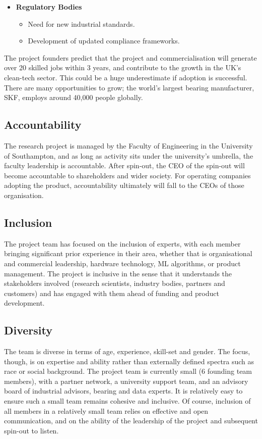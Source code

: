 \documentclass[runningheads]{llncs}
\begin{document}
\begin{itemize}
\begin{itemize}
        \item Loss of market for bearing manufacturers who rely solely on volume.
        \item Proposed bearings are more sophisticated, and greater added value.
        \item Manufacturers-under-license need to be forward-looking.
    \end{itemize}
    \item \textbf{Regulatory Bodies}
    \begin{itemize}
        \item Need for new industrial standards.
        \item Development of updated compliance frameworks.
    \end{itemize}
    \end{itemize}
    The project founders predict that the project and commercialisation will generate over 20 skilled jobs within 3 years, and contribute to the growth in the UK's clean-tech sector. This could be a huge underestimate if adoption is successful. There are many opportunities to grow; the world's largest bearing manufacturer, SKF, employs around 40,000 people globally.
\subsection{Accountability}
    The research project is managed by the Faculty of Engineering in the University of Southampton, and as long as activity sits under the university's umbrella, the faculty leadership is accountable. After spin-out, the CEO of the spin-out will become accountable to shareholders and wider society. For operating companies adopting the product, accountability ultimately will fall to the CEOs of those organisation.
\subsection{Inclusion}
    The project team has focused on the inclusion of experts, with each member bringing significant prior experience in their area, whether that is organisational and commercial leadership, hardware technology, ML algorithms, or product management. The project is inclusive in the sense that it understands the stakeholders involved (research scientists, industry bodies, partners and customers) and has engaged with them ahead of funding and product development.
\subsection{Diversity}
    The team is diverse in terms of age, experience, skill-set and gender. The focus, though, is on expertise and ability rather than externally defined spectra such as race or social background.
    The project team is currently small (6 founding team members), with a partner network, a university support team, and an advisory board of industrial advisors, bearing and data experts. It is relatively easy to ensure such a small team remains cohesive and inclusive. Of course, inclusion of all members in a relatively small team relies on effective and open communication, and on the ability of the leadership of the project and subsequent spin-out to listen.
\end{document}
